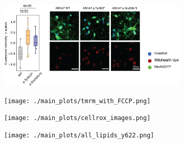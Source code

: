 \begin{figure}[ht]
\begin{subfigure}[t]{.2\textwidth}
    \end{subfigure}   
    \begin{subfigure}[t]{.5\textwidth}
        \caption{}
        \includegraphics[width=\textwidth]{./extended_plots/mitohealth_dye.png}        
    \end{subfigure}    
    \begin{subfigure}[t]{.4\textwidth}
        \caption{}
        \texttt{[image: ./main\_plots/tmrm\_with\_FCCP.png]}        
    \end{subfigure}    
    \begin{subfigure}[t]{.3\textwidth}
        \caption{}
        \texttt{[image: ./main\_plots/cellrox\_images.png]}        
    \end{subfigure}  
    \begin{subfigure}[t]{.3\textwidth}
        \caption{}
        \texttt{[image: ./main\_plots/all\_lipids\_y622.png]}        
    \end{subfigure}  




\end{figure}
